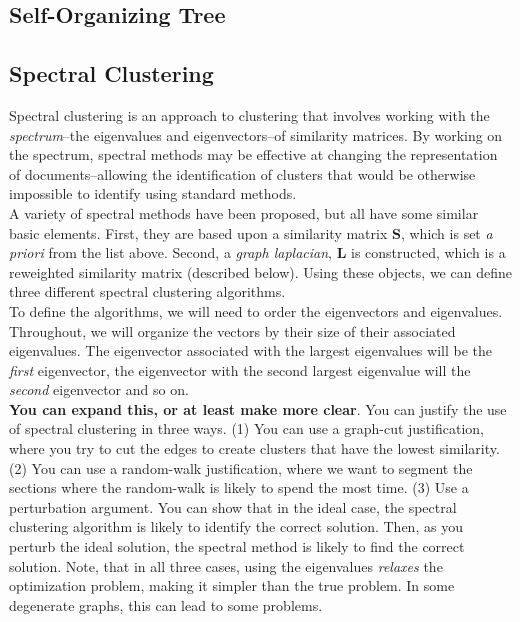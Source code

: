 \documentclass[11pt,letterpaper]{article}
\numberwithin{equation}{section}
\begin{document}
\subsection{Self-Organizing Tree}

\subsection{Spectral Clustering}
Spectral clustering is an approach to clustering that involves
working with the \emph{spectrum}--the eigenvalues and
eigenvectors--of similarity matrices.  By working on the spectrum,
spectral methods may be effective at changing the representation of
documents--allowing the identification of clusters that would be
otherwise impossible to identify using standard methods.\\
\indent A variety of spectral methods have been proposed, but all
have some similar basic elements.  First, they are based upon a
similarity matrix $\boldsymbol{S}$, which is set \emph{a priori}
from the list above.  Second, a \emph{graph laplacian},
$\boldsymbol{L}$ is constructed, which is a reweighted similarity
matrix (described below).  Using these objects, we can define three
different spectral clustering algorithms.\\
\indent To define the algorithms, we will need to order the
eigenvectors and eigenvalues.  Throughout, we will organize the
vectors by their size of their associated eigenvalues.  The
eigenvector associated with the largest eigenvalues will be the
\emph{first} eigenvector, the eigenvector with the second largest
eigenvalue will the \emph{second} eigenvector and so on.\\
\indent \textbf{You can expand this, or at least make more clear}.
You can justify the use of spectral clustering in three ways.  (1)
You can use a graph-cut justification, where you try to cut the
edges to create clusters that have the lowest similarity. (2) You
can use a random-walk justification, where we want to segment the
sections where the random-walk is likely to spend the most time. (3)
Use a perturbation argument.  You can show that in the ideal case,
the spectral clustering algorithm is likely to identify the correct
solution.  Then, as you perturb the ideal solution, the spectral
method is likely to find the correct solution.  Note, that in all
three cases, using the eigenvalues \emph{relaxes} the optimization
problem, making it simpler than the true problem.  In some
degenerate graphs, this can lead to some problems.
\end{document}
